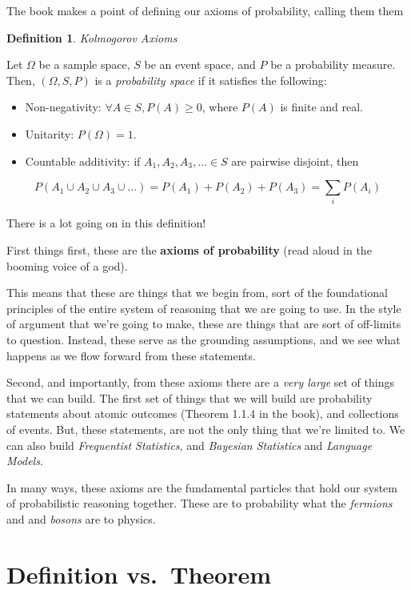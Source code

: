 \documentclass[
]{book}
\providecommand{\tightlist}{%
  \setlength{\itemsep}{0pt}\setlength{\parskip}{0pt}}
\theoremstyle{definition}
\newtheorem{definition}{Definition}[chapter]
\theoremstyle{definition}
\theoremstyle{definition}
\theoremstyle{definition}
\theoremstyle{remark}
\begin{document}
The book makes a point of defining our axioms of probability, calling them them

\begin{definition}
\emph{Kolmogorov Axioms}

Let \(\Omega\) be a sample space, \(S\) be an event space, and \(P\) be a probability measure. Then, \((\Omega, S, P)\) is a \emph{probability space} if it satisfies the following:

\begin{itemize}
\tightlist
\item
  Non-negativity: \(\forall A \in S, P(A) \geq 0\), where \(P(A)\) is finite and real.
\item
  Unitarity: \(P(\Omega)=1\).
\item
  Countable additivity: if \(A_1, A_2, A_3, \dots \in S\) are pairwise disjoint, then
\end{itemize}

\[
P(A_1 \cup A_2 \cup A_3 \cup \dots) = P(A_1) + P(A_2) + P(A_3) = \sum_{i}P(A_{i})
\]
\end{definition}

There is a lot going on in this definition!

First things first, these are the \textbf{axioms of probability} (read aloud in the booming voice of a god).

This means that these are things that we begin from, sort of the foundational principles of the entire system of reasoning that we are going to use. In the style of argument that we're going to make, these are things that are sort of off-limits to question. Instead, these serve as the grounding assumptions, and we see what happens as we flow forward from these statements.

Second, and importantly, from these axioms there are a \emph{very large} set of things that we can build. The first set of things that we will build are probability statements about atomic outcomes (Theorem 1.1.4 in the book), and collections of events. But, these statements, are not the only thing that we're limited to. We can also build \emph{Frequentist Statistics}, and \emph{Bayesian Statistics} and \emph{Language Models}.

In many ways, these axioms are the fundamental particles that hold our system of probabilistic reasoning together. These are to probability what the \emph{fermions} and and \emph{bosons} are to physics.

\hypertarget{definition-vs.-theorem}{%
\section{Definition vs.~Theorem}\label{definition-vs.-theorem}}
\end{document}
